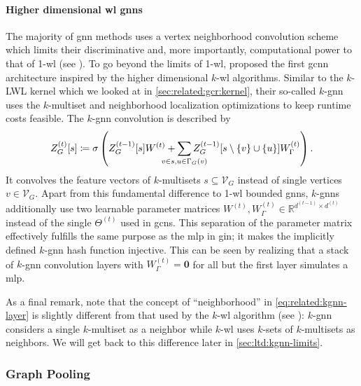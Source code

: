 \paragraph{Higher dimensional \ac{wl} \acp{gnn}}
The majority of \ac{gnn} methods uses a vertex neighborhood convolution scheme which limits their discriminative and, more importantly, computational power to that of 1-\acs{wl} (see ).
To go beyond the limits of 1-\acs{wl}, \citet{Morris2019} proposed the first \ac{gcnn} architecture inspired by the higher dimensional $k$-\acs{wl} algorithms.
Similar to the $k$-LWL kernel which we looked at in \cref{sec:related:gcr:kernel}, their so-called $k$-\acs{gnn} uses the $k$-multiset and neighborhood localization optimizations to keep runtime costs feasible.
The $k$-\ac{gnn} convolution is described by
\begin{align}
	Z_G^{(t)}[s] \coloneqq \sigma\left( {Z_G^{(t-1)}[s]} W^{(t)} + \smashoperator[lr]{\sum_{{v \in s}, {u \in \Gamma_G(v)}}} {Z_G^{(t-1)}[s \setminus \{ v \} \cup \{ u \}]} W_{\Gamma}^{(t)} \right) \text{.} \label{eq:related:kgnn-layer}
\end{align}
It convolves the feature vectors of $k$-multisets $s \subseteq \mathcal{V}_G$ instead of single vertices $v \in \mathcal{V}_G$.
Apart from this fundamental difference to 1-\acs{wl} bounded \acp{gnn}, $k$-\acp{gnn} additionally use two learnable parameter matrices $W^{(t)}, W_{\Gamma}^{(t)} \in \mathbb{R}^{d^{(t-1)} \times d^{(t)}}$ instead of the single $\Theta^{(t)}$ used in \acp{gcn}.
This separation of the parameter matrix effectively fulfills the same purpose as the \ac{mlp} in \ac{gin}; it makes the implicitly defined $k$-\acs{gnn} hash function injective.
This can be seen by realizing that a stack of $k$-\acs{gnn} convolution layers with $W_{\Gamma}^{(t)} = \mathbf{0}$ for all but the first layer simulates a \ac{mlp}.

As a final remark, note that the concept of ``neighborhood'' in \cref{eq:related:kgnn-layer} is slightly different from that used by the $k$-\acs{wl} algorithm (see ):
$k$-\acs{gnn} considers a single $k$-multiset as a neighbor while $k$-\acs{wl} uses $k$-sets of $k$-multisets as neighbors.
We will get back to this difference later in \cref{sec:ltd:kgnn-limits}.

\subsubsection{Graph Pooling}

